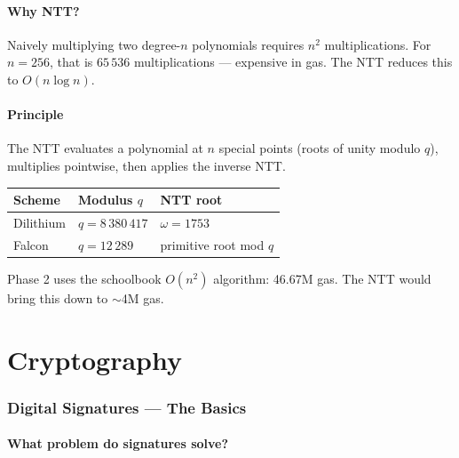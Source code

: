 \documentclass[11pt,a4paper]{article}
\begin{document}
\subsection{Why NTT?}

Naively multiplying two degree-$n$ polynomials requires $n^2$ multiplications. For $n=256$, that is $65\,536$ multiplications --- expensive in gas. The NTT reduces this to $O(n \log n)$.

\subsection{Principle}

The NTT evaluates a polynomial at $n$ special points (roots of unity modulo $q$), multiplies pointwise, then applies the inverse NTT.

\begin{center}
\begin{tabular}{lll}
\toprule
\textbf{Scheme} & \textbf{Modulus $q$} & \textbf{NTT root} \\
\midrule
Dilithium & $q = 8\,380\,417$ & $\omega = 1753$ \\
Falcon    & $q = 12\,289$     & primitive root mod $q$ \\
\bottomrule
\end{tabular}
\end{center}

\begin{warningbox}
Phase 2 uses the schoolbook $O(n^2)$ algorithm: 46.67M gas. The NTT would bring this down to $\sim$4M gas.
\end{warningbox}

\newpage
\part{Cryptography}

\section{Digital Signatures --- The Basics}

\subsection{What problem do signatures solve?}
\end{document}

